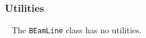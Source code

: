 \subsubsection{Utilities} ~\newline
\noindent
The \texttt{BEamLine} class has no utilities.

\FloatBarrier
